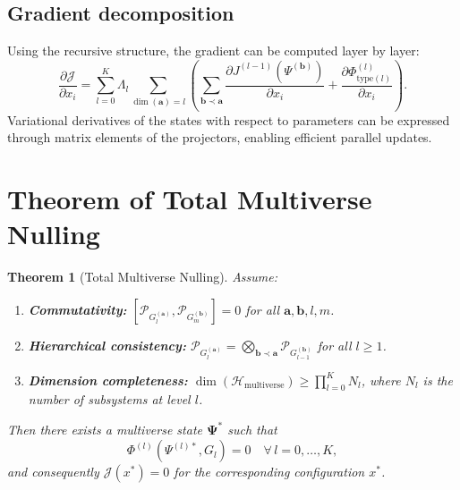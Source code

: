 \documentclass[12pt,a4paper]{article}
\newtheorem{theorem}{Theorem}[section]
\newcommand{\pG}{\mathcal{P}_{G}}
\newcommand{\JJ}{\mathcal{J}}
\newcommand{\HH}{\mathcal{H}}
\begin{document}
\subsection{Gradient decomposition}
Using the recursive structure, the gradient can be computed layer by layer:
\begin{equation}\label{eq:graddecomp}
\frac{\partial \JJ}{\partial x_i} = \sum_{l=0}^K \Lambda_l \sum_{\dim(\mathbf{a})=l}
\left( \sum_{\mathbf{b}\prec\mathbf{a}} \frac{\partial J^{(l-1)}(\Psi^{(\mathbf{b})})}{\partial x_i} + \frac{\partial \Phi^{(l)}_{\text{type}(l)}}{\partial x_i} \right).
\end{equation}
Variational derivatives of the states with respect to parameters can be expressed through matrix elements of the projectors, enabling efficient parallel updates.

\section{Theorem of Total Multiverse Nulling}

\begin{theorem}[Total Multiverse Nulling]\label{thm:null}
Assume:
\begin{enumerate}
\item[(i)] \textbf{Commutativity:} $[\pG_l^{(\mathbf{a})}, \pG_m^{(\mathbf{b})}] = 0$ for all $\mathbf{a},\mathbf{b},l,m$.
\item[(ii)] \textbf{Hierarchical consistency:} $\pG_l^{(\mathbf{a})} = \bigotimes_{\mathbf{b}\prec\mathbf{a}} \pG_{l-1}^{(\mathbf{b})}$ for all $l\ge 1$.
\item[(iii)] \textbf{Dimension completeness:} $\dim(\HH_{\text{multiverse}}) \ge \prod_{l=0}^K N_l$, where $N_l$ is the number of subsystems at level $l$.
\end{enumerate}
Then there exists a multiverse state $\mathbf{\Psi}^*$ such that
\[
\Phi^{(l)}(\Psi^{(l)*}, G_l) = 0 \quad \forall\, l=0,\dots,K,
\]
and consequently $\JJ(x^*) = 0$ for the corresponding configuration $x^*$.
\end{theorem}
\end{document}
